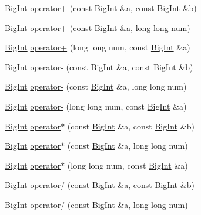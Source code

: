 \begin{DoxyCompactItemize}
\item 
\hyperlink{class_big_int}{Big\+Int} \hyperlink{class_big_int_a99b2d896b393bf61492d6a8679053240}{operator+} (const \hyperlink{class_big_int}{Big\+Int} \&a, const \hyperlink{class_big_int}{Big\+Int} \&b)
\item 
\hyperlink{class_big_int}{Big\+Int} \hyperlink{class_big_int_a49094568be86f407d234fcc6f00b184c}{operator+} (const \hyperlink{class_big_int}{Big\+Int} \&a, long long num)
\item 
\hyperlink{class_big_int}{Big\+Int} \hyperlink{class_big_int_a9411c77fc375b6dc692dbb62972dd99e}{operator+} (long long num, const \hyperlink{class_big_int}{Big\+Int} \&a)
\item 
\hyperlink{class_big_int}{Big\+Int} \hyperlink{class_big_int_a83e7a63b3c5d80f2e8941ee13130bf4b}{operator-\/} (const \hyperlink{class_big_int}{Big\+Int} \&a, const \hyperlink{class_big_int}{Big\+Int} \&b)
\item 
\hyperlink{class_big_int}{Big\+Int} \hyperlink{class_big_int_a38fdaadd250b30d28e277fd5adde2e02}{operator-\/} (const \hyperlink{class_big_int}{Big\+Int} \&a, long long num)
\item 
\hyperlink{class_big_int}{Big\+Int} \hyperlink{class_big_int_a06ce9642ecefa2aceecd4b116ba3eb21}{operator-\/} (long long num, const \hyperlink{class_big_int}{Big\+Int} \&a)
\item 
\hyperlink{class_big_int}{Big\+Int} \hyperlink{class_big_int_ad7b8aa42fc035e14b788ecf3ce2bcd75}{operator$\ast$} (const \hyperlink{class_big_int}{Big\+Int} \&a, const \hyperlink{class_big_int}{Big\+Int} \&b)
\item 
\hyperlink{class_big_int}{Big\+Int} \hyperlink{class_big_int_a9e33d5e6cccf7d66e8d32f022b94b3dc}{operator$\ast$} (const \hyperlink{class_big_int}{Big\+Int} \&a, long long num)
\item 
\hyperlink{class_big_int}{Big\+Int} \hyperlink{class_big_int_ad35e3c825312ccddbed451256f43d4a9}{operator$\ast$} (long long num, const \hyperlink{class_big_int}{Big\+Int} \&a)
\item 
\hyperlink{class_big_int}{Big\+Int} \hyperlink{class_big_int_a4f32efafa21a72217064fce4f1b050b3}{operator/} (const \hyperlink{class_big_int}{Big\+Int} \&a, const \hyperlink{class_big_int}{Big\+Int} \&b)
\item 
\hyperlink{class_big_int}{Big\+Int} \hyperlink{class_big_int_ae879f205898eae6cf31b4f565f5a5ec1}{operator/} (const \hyperlink{class_big_int}{Big\+Int} \&a, long long num)

\end{DoxyCompactItemize}
